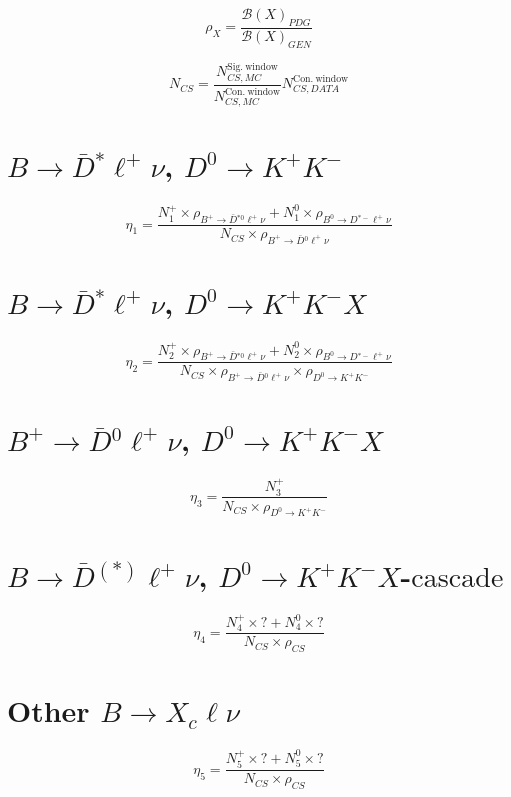 \documentclass[preview]{article}
\begin{document}
$$\rho_X = \frac{\mathcal{B}(X)_{PDG}}{\mathcal{B}(X)_{GEN}}$$

$$N_{CS} = \frac{N_{CS,MC}^{\mathrm{Sig.~window}}}{N_{CS,MC}^{\mathrm{Con.~window}}}N_{CS,DATA}^{\mathrm{Con.~window}}$$


\section{$B \to \bar D {}^* \ell^+ \nu$, $D^0 \to K^+K^-$}
\begin{equation}
\eta_1 = \frac{N_1^+ \times \rho_{B^+ \to \bar D {}^{*0} \ell^+ \nu} + N_1^0 \times \rho_{B^0 \to D {}^{*-} \ell^+ \nu}}{N_{CS}\times\rho_{B^+ \to \bar D {}^0 \ell^+ \nu}}
\end{equation}

\section{$B \to \bar D {}^* \ell^+ \nu$, $D^0 \to K^+K^-X$}
\begin{equation}
\eta_2 = \frac{N_2^+ \times \rho_{B^+ \to \bar D {}^{*0} \ell^+ \nu} + N_2^0 \times \rho_{B^0 \to D {}^{*-} \ell^+ \nu}}{N_{CS}\times\rho_{B^+ \to \bar D {}^0 \ell^+ \nu}\times\rho_{D^0 \to K^+K^-}}
\end{equation}

\section{$B^+ \to \bar D {}^0 \ell^+ \nu$, $D^0 \to K^+K^-X$}
\begin{equation}
\eta_3 = \frac{N_3^+}{N_{CS}\times\rho_{D^0 \to K^+K^-}}
\end{equation}

\section{$B \to \bar D {}^{(*)} \ell^+ \nu$, $D^0 \to K^+K^-X$-$\mathrm{cascade}$}
\begin{equation}
\eta_4 = \frac{N_4^+ \times ? + N_4^0 \times ?}{N_{CS}\times\rho_{CS}}
\end{equation}

\section{Other $B\to X_c \ell \nu$}
\begin{equation}
\eta_5 = \frac{N_5^+ \times ? + N_5^0 \times ?}{N_{CS}\times\rho_{CS}}
\end{equation}
\end{document}
